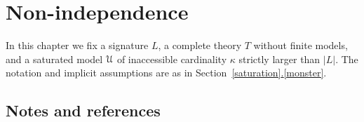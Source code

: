 \documentclass[creche.tex]{subfiles}
\begin{document}
\chapter{Non-independence}
\label{nip}

\def\medrel#1{\parbox[t]{6ex}{$\displaystyle\hfil #1$}}
\def\ceq#1#2#3{\parbox{25ex}{$\displaystyle #1$}\medrel{#2}$\displaystyle  #3$}



In this chapter we fix a signature $L$, a complete theory $T$ without finite models, and a saturated model $\EuScript U$ of inaccessible cardinality $\kappa$ strictly larger than $|L|$.
The notation and implicit assumptions are as in Section~\hyperref[monster]{\ref*{saturation}.\ref*{monster}}.



% 

\section{Notes and references}
\begin{biblist}[]\normalsize




\end{biblist}
\end{document}

